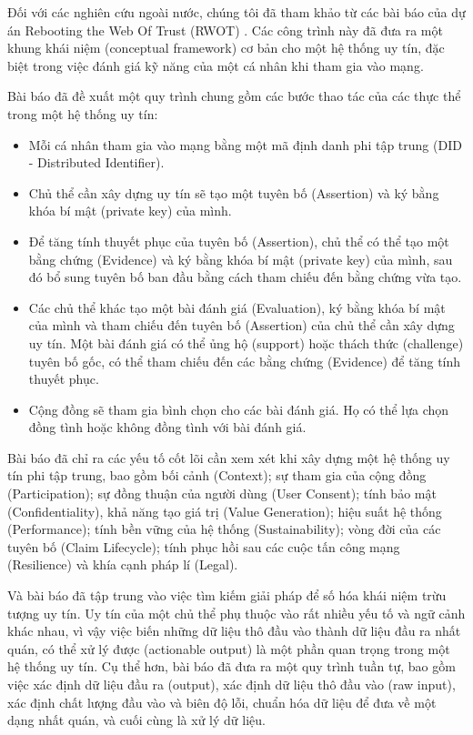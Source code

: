 \documentclass{article}[14pt]
\begin{document}
{  \par
  Đối với các nghiên cứu ngoài nước, chúng tôi đã tham khảo từ các bài báo của dự án Rebooting the Web Of Trust (RWOT) \cite{reputation-toolkit, reputation-design, reputation-interpretation}. Các công trình này đã đưa ra một khung khái niệm (conceptual framework) cơ bản cho một hệ thống uy tín, đặc biệt trong việc đánh giá kỹ năng của một cá nhân khi tham gia vào mạng.
  \par
  Bài báo \cite{reputation-toolkit} đã đề xuất một quy trình chung gồm các bước thao tác của các thực thể trong một hệ thống uy tín:
  \begin{itemize}
      \item Mỗi cá nhân tham gia vào mạng bằng một mã định danh phi tập trung (DID - Distributed Identifier).
      \item Chủ thể cần xây dựng uy tín sẽ tạo một tuyên bố (Assertion) và ký bằng khóa bí mật (private key) của mình.
      \item Để tăng tính thuyết phục của tuyên bố (Assertion), chủ thể có thể tạo một bằng chứng (Evidence) và ký bằng khóa bí mật (private key) của mình, sau đó bổ sung tuyên bố ban đầu bằng cách tham chiếu đến bằng chứng vừa tạo.
      \item Các chủ thể khác tạo một bài đánh giá (Evaluation), ký bằng khóa bí mật của mình và tham chiếu đến tuyên bố (Assertion) của chủ thể cần xây dựng uy tín. Một bài đánh giá có thể ủng hộ (support) hoặc thách thức (challenge) tuyên bố gốc, có thể tham chiếu đến các bằng chứng (Evidence) để tăng tính thuyết phục.
      \item Cộng đồng sẽ tham gia bình chọn cho các bài đánh giá. Họ có thể lựa chọn đồng tình hoặc không đồng tình với bài đánh giá.
  \end{itemize}
  Bài báo \cite{reputation-design} đã chỉ ra các yếu tố cốt lõi cần xem xét khi xây dựng một hệ thống uy tín phi tập trung, bao gồm bối cảnh (Context); sự tham gia của cộng đồng (Participation); sự đồng thuận của người dùng (User Consent); tính bảo mật (Confidentiality), khả năng tạo giá trị (Value Generation); hiệu suất hệ thống (Performance); tính bền vững của hệ thống (Sustainability); vòng đời của các tuyên bố (Claim Lifecycle); tính phục hồi sau các cuộc tấn công mạng (Resilience) và khía cạnh pháp lí (Legal).
  \par
  Và bài báo \cite{reputation-interpretation} đã tập trung vào việc tìm kiếm giải pháp để số hóa khái niệm trừu tượng uy tín. Uy tín của một chủ thể phụ thuộc vào rất nhiều yếu tố và ngữ cảnh khác nhau, vì vậy việc biến những dữ liệu thô đầu vào thành dữ liệu đầu ra nhất quán, có thể xử lý được (actionable output) là một phần quan trọng trong một hệ thống uy tín. Cụ thể hơn, bài báo đã đưa ra một quy trình tuần tự, bao gồm việc xác định dữ liệu đầu ra (output), xác định dữ liệu thô đầu vào (raw input), xác định chất lượng đầu vào và biên độ lỗi, chuẩn hóa dữ liệu để đưa về một dạng nhất quán, và cuối cùng là xử lý dữ liệu.
}
\end{document}
